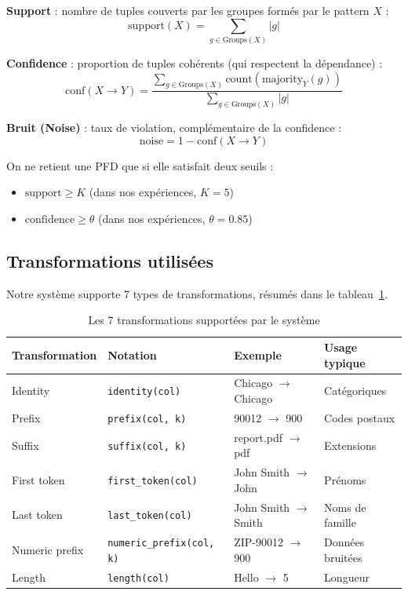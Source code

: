 \documentclass[12pt,a4paper]{article}
\begin{document}
\begin{tcolorbox}[colback=orange!5!white, colframe=orange!50!black, title=M\'{e}triques de qualit\'{e}]
\textbf{Support} : nombre de tuples couverts par les groupes form\'{e}s par le pattern $X$ :
$$\text{support}(X) = \sum_{g \in \text{Groups}(X)} |g|$$

\textbf{Confidence} : proportion de tuples \og{}coh\'{e}rents\fg{} (qui respectent la d\'{e}pendance) :
$$\text{conf}(X \rightarrow Y) = \frac{\sum_{g \in \text{Groups}(X)} \text{count}(\text{majority}_Y(g))}{\sum_{g \in \text{Groups}(X)} |g|}$$

\textbf{Bruit (Noise)} : taux de violation, compl\'{e}mentaire de la confidence :
$$\text{noise} = 1 - \text{conf}(X \rightarrow Y)$$
\end{tcolorbox}

On ne retient une PFD que si elle satisfait deux seuils :
\begin{itemize}
    \item $\text{support} \geq K$ (dans nos exp\'{e}riences, $K = 5$)
    \item $\text{confidence} \geq \theta$ (dans nos exp\'{e}riences, $\theta = 0.85$)
\end{itemize}

\subsection{Transformations utilis\'{e}es}

Notre syst\`{e}me supporte 7 types de transformations, r\'{e}sum\'{e}s dans le tableau~\ref{tab:transformations}.

\begin{table}[H]
\centering
\caption{Les 7 transformations support\'{e}es par le syst\`{e}me}
\label{tab:transformations}
\footnotesize
\begin{tabular}{@{}llll@{}}
\toprule
\textbf{Transformation} & \textbf{Notation} & \textbf{Exemple} & \textbf{Usage typique} \\
\midrule
Identity & \texttt{identity(col)} & \og{}Chicago\fg{} $\to$ \og{}Chicago\fg{} & Cat\'{e}goriques \\
Prefix & \texttt{prefix(col, k)} & \og{}90012\fg{} $\to$ \og{}900\fg{} & Codes postaux \\
Suffix & \texttt{suffix(col, k)} & \og{}report.pdf\fg{} $\to$ \og{}pdf\fg{} & Extensions \\
First token & \texttt{first\_token(col)} & \og{}John Smith\fg{} $\to$ \og{}John\fg{} & Pr\'{e}noms \\
Last token & \texttt{last\_token(col)} & \og{}John Smith\fg{} $\to$ \og{}Smith\fg{} & Noms de famille \\
Numeric prefix & \texttt{numeric\_prefix(col, k)} & \og{}ZIP-90012\fg{} $\to$ \og{}900\fg{} & Donn\'{e}es bruit\'{e}es \\
Length & \texttt{length(col)} & \og{}Hello\fg{} $\to$ \og{}5\fg{} & Longueur \\
\bottomrule
\end{tabular}
\end{table}
\end{document}
